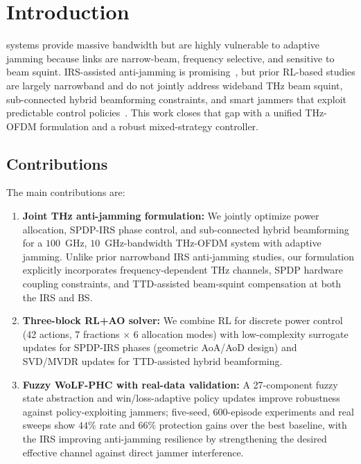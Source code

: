 \documentclass[journal,twocolumn]{IEEEtran}
\begin{document}
\section{Introduction}
\label{sec:intro}

 systems provide massive bandwidth but are highly vulnerable to adaptive jamming because links are narrow-beam, frequency selective, and sensitive to beam squint. IRS-assisted anti-jamming is promising~\cite{wu2019intelligent,wu2021irs_survey,renzo2020smart}, but prior RL-based studies are largely narrowband and do not jointly address wideband THz beam squint, sub-connected hybrid beamforming constraints, and smart jammers that exploit predictable control policies~\cite{yang2021irs,su2023wideband,yan2023beamforming}. This work closes that gap with a unified THz-OFDM formulation and a robust mixed-strategy controller.

\subsection{Contributions}

The main contributions are:

\begin{enumerate}
\item \textbf{Joint THz anti-jamming formulation:} We jointly optimize power allocation, SPDP-IRS phase control, and sub-connected hybrid beamforming for a $100$~GHz, $10$~GHz-bandwidth THz-OFDM system with adaptive jamming. Unlike prior narrowband IRS anti-jamming studies, our formulation explicitly incorporates frequency-dependent THz channels, SPDP hardware coupling constraints, and TTD-assisted beam-squint compensation at both the IRS and BS.
\item \textbf{Three-block RL+AO solver:} We combine RL for discrete power control (42 actions, 7 fractions $\times$ 6 allocation modes) with low-complexity surrogate updates for SPDP-IRS phases (geometric AoA/AoD design) and SVD/MVDR updates for TTD-assisted hybrid beamforming.
\item \textbf{Fuzzy WoLF-PHC with real-data validation:} A 27-component fuzzy state abstraction and win/loss-adaptive policy updates improve robustness against policy-exploiting jammers; five-seed, 600-episode experiments and real sweeps show $44\%$ rate and $66\%$ protection gains over the best baseline, with the IRS improving anti-jamming resilience by strengthening the desired effective channel against direct jammer interference.
\end{enumerate}
\end{document}
